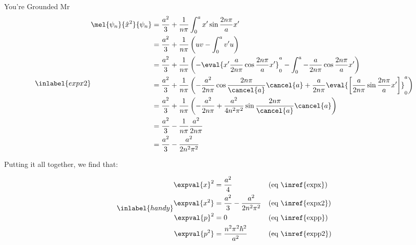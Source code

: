 \begin{answer}
\begin{answerpart}{You're Grounded Mr}
    \begin{equation}
      \inlabel{expx2}
      \begin{split}
        \mel{\psi_n}{\hat{x}^2}{\psi_n}
        &=
        \frac{a^2}{3}
        +
        \frac{1}{n\pi}
        \int_0^a
        x'\sin{\frac{2n\pi}{a}x'}
        \\
        &=
        \frac{a^2}{3}
        +
        \frac{1}{n\pi}
        \left(
        uv - \int_0^a v'u
        \right)
        \\
        &=
        \frac{a^2}{3}
        +
        \frac{1}{n\pi}
        \left(
        -\eval{
          x'\frac{a}{2n\pi}\cos{\frac{2n\pi}{a}x'}
        }_0^a
        -
        \int_0^a
        -\frac{a}{2n\pi}\cos{\frac{2n\pi}{a}x'}
        \right)
        \\
        &=
        \frac{a^2}{3}
        +
        \frac{1}{n\pi}
        \left(
        -\frac{a^2}{2n\pi}\cos{\frac{2n\pi}{\cancel{a}}\cancel{a}}
        +
        \frac{a}{2n\pi}
        \eval{
          \left[
          \frac{a}{2n\pi}\sin{\frac{2n\pi}{a}x'}
          \right]
        }_0^a
        \right)
        \\
        &=
        \frac{a^2}{3}
        +
        \frac{1}{n\pi}
        \left(
        -\frac{a^2}{2n\pi}
        +
        \frac{a^2}{4n^2\pi^2}
        \sin{\frac{2n\pi}{\cancel{a}}\cancel{a}}
        \right)
        \\
        &=
        \frac{a^2}{3}
        -
        \frac{1}{n\pi}
        \frac{a^2}{2n\pi}
        \\
        &=
        \frac{a^2}{3} - \frac{a^2}{2n^2\pi^2}
        \\
      \end{split}
    \end{equation}

    
    Putting it all together, we find that:

    \begin{equation}
      \inlabel{handy}
      \begin{alignedat}{2}
        \expval{x}^2 &= \frac{a^2}{4} & \quad{} &\text{(eq \inref{expx})}\\
        \expval{x^2} &= \frac{a^2}{3} - \frac{a^2}{2n^2\pi^2} & &\text{(eq \inref{expx2})}\\
        \expval{p}^2 &= 0 & &\text{(eq \inref{expp})}\\
        \expval{p^2} &= \frac{n^2\pi^2\hbar^2}{a^2} & &\text{(eq \inref{expp2})}\\
      \end{alignedat}
    \end{equation}


\end{answerpart}
\end{answer}
